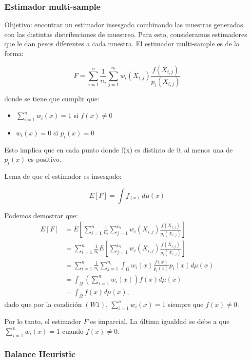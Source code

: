 \documentclass{article}
\begin{document}
\subsubsection{Estimador multi-sample}

Objetivo: encontrar un estimador insesgado combinando las muestras generadas con las distintas distribuciones de muestreo.
Para esto, consideramos estimadores que le dan pesos diferentes a cada muestra.
El estimador multi-sample es de la forma:

$$F = \sum_{i=1}^{n} \frac{1}{n_{i}} \sum_{j=1}^{n_{i}} w_{i}(X_{i,j}) \frac{f(X_{i,j})}{p_{i}(X_{i,j})}$$

donde se tiene que cumplir que:

\begin{itemize}
    \item $\sum_{i=1}^{n} w_{i}(x) = 1$ si $f(x) \neq 0$
    \item $w_{i}(x) = 0$ si $p_{i}(x) = 0$
\end{itemize}

Esto implica que en cada punto donde f(x) es distinto de 0, al menos una de $p_{i}(x)$ es positivo.

Lema de que el estimador es insesgado:

$$E[F] = \int f_(x) \,d\mu(x)$$

Podemos demostrar que:
\begin{align*}
E[F] &= E\left[\sum_{i=1}^n \frac{1}{n_i} \sum_{j=1}^{n_i} w_i(X_{i,j}) \frac{f(X_{i,j})}{p_i(X_{i,j})}\right] \\
&= \sum_{i=1}^n \frac{1}{n_i} E\left[\sum_{j=1}^{n_i} w_i(X_{i,j}) \frac{f(X_{i,j})}{p_i(X_{i,j})}\right] \\
&= \sum_{i=1}^n \frac{1}{n_i} \sum_{j=1}^{n_i} \int_{\Omega} w_i(x) \frac{f(x)}{p_i(x)} p_i(x) d\mu(x) \\
&= \int_{\Omega} \left(\sum_{i=1}^n w_i(x)\right) f(x) d\mu(x) \\
&= \int_{\Omega} f(x) d\mu(x),
\end{align*}
dado que por la condición \( (W1) \), \( \sum_{i=1}^n w_i(x) = 1 \) siempre que \( f(x) \neq 0 \).

Por lo tanto, el estimador \( F \) es imparcial. La última igualdad se debe a que \( \sum_{i=1}^n w_i(x) = 1 \) cuando \( f(x) \neq 0 \).

\subsubsection{Balance Heuristic}
\end{document}
